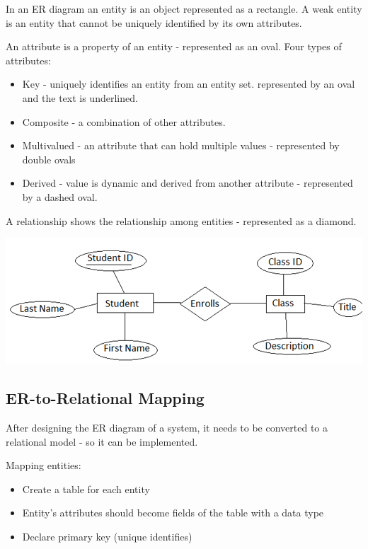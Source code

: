 \documentclass{article}
\begin{document}
    In an ER diagram an entity is an object represented as a rectangle. A weak entity is 
    an entity that cannot be uniquely identified by its own attributes.

    An attribute is a property of an entity - represented as an oval. Four types of
    attributes:
    \begin{itemize}
        \item Key - uniquely identifies an entity from an entity set. represented by an 
        oval and the text is underlined.
        \item Composite - a combination of other attributes.
        \item Multivalued - an attribute that can hold multiple values - represented by 
        double ovals
        \item Derived - value is dynamic and derived from another attribute - represented 
        by a dashed oval.
    \end{itemize}

    A relationship shows the relationship among entities - represented as a diamond.

    \begin{center}
        \includegraphics[scale=0.7]{ER_diagram.png}
    \end{center}

    \subsection*{ER-to-Relational Mapping}

    After designing the ER diagram of a system, it needs to be converted to a relational 
    model - so it can be implemented.

    Mapping entities:
    \begin{itemize}
        \item Create a table for each entity
        \item Entity's attributes should become fields of the table with a data type 
        \item Declare primary key (unique identifies)
    \end{itemize}
\end{document}
